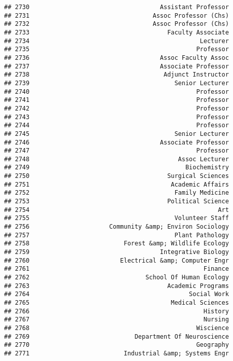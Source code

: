 \documentclass[
]{article}
\begin{document}
\begin{verbatim}
## 2730                                    Assistant Professor
## 2731                                  Assoc Professor (Chs)
## 2732                                  Assoc Professor (Chs)
## 2733                                      Faculty Associate
## 2734                                               Lecturer
## 2735                                              Professor
## 2736                                    Assoc Faculty Assoc
## 2737                                    Associate Professor
## 2738                                     Adjunct Instructor
## 2739                                        Senior Lecturer
## 2740                                              Professor
## 2741                                              Professor
## 2742                                              Professor
## 2743                                              Professor
## 2744                                              Professor
## 2745                                        Senior Lecturer
## 2746                                    Associate Professor
## 2747                                              Professor
## 2748                                         Assoc Lecturer
## 2749                                           Biochemistry
## 2750                                      Surgical Sciences
## 2751                                       Academic Affairs
## 2752                                        Family Medicine
## 2753                                      Political Science
## 2754                                                    Art
## 2755                                        Volunteer Staff
## 2756                      Community &amp; Environ Sociology
## 2757                                        Plant Pathology
## 2758                          Forest &amp; Wildlife Ecology
## 2759                                    Integrative Biology
## 2760                         Electrical &amp; Computer Engr
## 2761                                                Finance
## 2762                                School Of Human Ecology
## 2763                                      Academic Programs
## 2764                                            Social Work
## 2765                                       Medical Sciences
## 2766                                                History
## 2767                                                Nursing
## 2768                                              Wiscience
## 2769                             Department Of Neuroscience
## 2770                                              Geography
## 2771                          Industrial &amp; Systems Engr

\end{verbatim}
\end{document}
